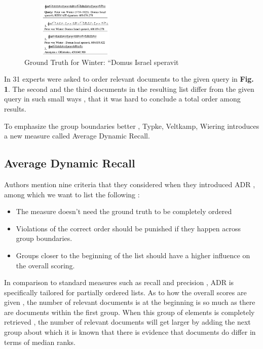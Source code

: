 \documentclass{llncs}
\begin{document}
 		\begin{figure}[h!]
			\centering
			\includegraphics[width=200px,height=100px,keepaspectratio]{one_of_two_point_four_point_four}
			\caption{Ground Truth for Winter: “Domus Israel speravit \cite{two_point_four_point_four}}
		\end{figure}


 		In \cite{two_point_four_point_four} 31 experts were asked to order relevant documents to the given query in \textbf{Fig. 1}. The second and the third documents in the resulting list differ from the given query in such small ways , that it was hard to conclude a total order among results.

 		To emphasize the group boundaries better , Typke, Veltkamp, Wiering \cite{two_point_four_point_four} introduces a new measure called Average Dynamic Recall. 

		\subsection{Average Dynamic Recall}
			
			
			Authors mention nine criteria that they considered when they introduced ADR , among which we want to list the following :

			\begin{itemize}
				\item The measure doesn't need the ground truth to be completely ordered
				\item Violations of the correct order should be punished if they happen across group boundaries.
				\item Groups closer to the beginning of the list should have a higher influence on the overall scoring.
			\end{itemize}

			In comparison to standard measures such as recall and precision , ADR is specifically tailored for partially ordered lists. As to how the overall scores are given , the number of relevant documents is at the beginning is so much as there are documents within the first group. When this group of elements is completely retrieved , the number of relevant documents will get larger by adding the next group about which it is known that there is evidence that documents do differ in terms of median ranks.
\end{document}
